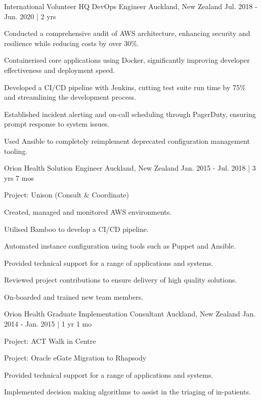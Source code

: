 \begin{cventries}
\cventry
{International Volunteer HQ} %
{DevOps Engineer} %
{Auckland, New Zealand} %
{Jul. 2018 - Jun. 2020 | 2 yrs} %
{ %
\begin{cvitems}
\item {Conducted a comprehensive audit of AWS architecture, enhancing security and resilience while reducing costs by over 30\%.}
\item {Containerised core applications using Docker, significantly improving developer effectiveness and deployment speed.}
\item {Developed a CI/CD pipeline with Jenkins, cutting test suite run time by 75\% and streamlining the development process.}
\item {Established incident alerting and on-call scheduling through PagerDuty, ensuring prompt response to system issues.}
\item {Used Ansible to completely reimplement deprecated configuration management tooling.}
\end{cvitems}
}


\cventry
{Orion Health} %
{Solution Engineer} %
{Auckland, New Zealand} %
{Jan. 2015 - Jul. 2018 | 3 yrs 7 mos} %
{ %
\begin{cvitems}
\item {Project: Unison (Consult \& Coordinate)}
\item {Created, managed and monitored AWS environments.}
\item {Utilised Bamboo to develop a CI/CD pipeline.}
\item {Automated instance configuration using tools such as Puppet and Ansible.}
\item {Provided technical support for a range of applications and systems.}
\item {Reviewed project contributions to ensure delivery of high quality solutions.}
\item {On-boarded and trained new team members.}
\end{cvitems}
}


\cventry
{Orion Health} %
{Graduate Implementation Consultant} %
{Auckland, New Zealand} %
{Jan. 2014 - Jan. 2015 | 1 yr 1 mo} %
{ %
\begin{cvitems}
\item {Project: ACT Walk in Centre}
\item {Project: Oracle eGate Migration to Rhapsody}
\item {Provided technical support for a range of applications and systems.}
\item {Implemented decision making algorithms to assist in the triaging of in-patients.}
\end{cvitems}
}


\end{cventries}
